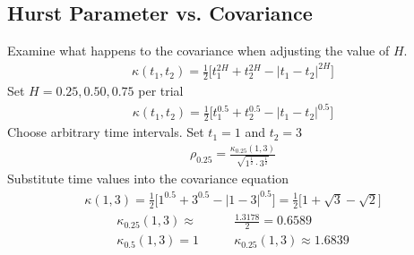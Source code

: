\documentclass{article}
\begin{document}
\subsection{Hurst Parameter vs. Covariance}
Examine what happens to the covariance when adjusting the value of $H$.
\begin{align*}
    \kappa(t_1, t_2)=\frac{1}{2}\Big[t_1^{2H}+t_2^{2H}-\Big|t_1-t_2\Big|^{2H}\Big]
\end{align*}
Set $H=0.25,0.50,0.75$ per trial
\begin{align*}
    \kappa(t_1, t_2)=\frac{1}{2}\Big[t_1^{0.5}+t_2^{0.5}-\Big|t_1-t_2\Big|^{0.5}\Big]
\end{align*}
Choose arbitrary time intervals. Set $t_1=1$ and $t_2=3$
\begin{align*}
    \rho_{0.25}=\frac{\kappa_{0.25}(1,3)}{\sqrt{1^{\frac{1}{2}}\cdot 3^{\frac{1}{2}}}}
\end{align*}
Substitute time values into the covariance equation
\begin{align*}
    \kappa(1, 3)=\frac{1}{2}\Big[1^{0.5}+3^{0.5}-\Big|1-3\Big|^{0.5}\Big]=\frac{1}{2}\Big[1+\sqrt{3}-\sqrt{2}\Big]
\end{align*}
\begin{align*}
    \kappa_{0.25}(1,3)\approx&\frac{1.3178}{2}=0.6589\\
    \kappa_{0.5}(1,3)=1\qquad &  \kappa_{0.25}(1,3)\approx1.6839
\end{align*}
\end{document}
